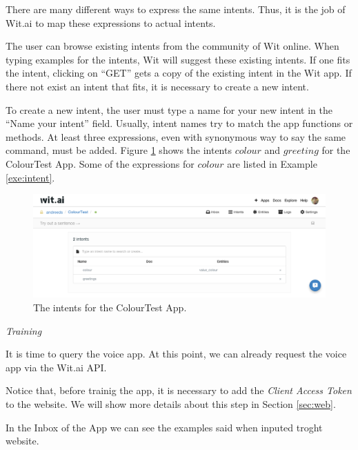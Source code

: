 There are many different ways to express the same intents. 
Thus, it is the job of Wit.ai to map these expressions to actual intents.

The user can browse existing intents from the community of Wit online.
When typing examples for the intents, Wit will suggest these existing intents. 
If one fits the intent, clicking on “GET” gets a copy of the existing intent in the Wit app.
If there not exist an intent that fits, it is necessary to create a new intent.

To create a new intent, the user must type a name for your new intent in the ``Name your intent'' field.
Usually, intent names try to match the app functions or methods. 
At least three expressions, even with synonymous way to say the same command, must be added.
Figure \ref{fig:entents} shows the intents $colour$ and $greeting$ for the ColourTest App.
Some of the expressions for $colour$ are listed in Example \ref{exe:intent}.


\begin{figure}[!h]
    \includegraphics[width=\textwidth]{figures/entities.png}
    \caption{The intents for the ColourTest App.}
    \label{fig:entents}
\end{figure}


\emph{Training}

It is time to query the voice app.
At this point, we can already request the voice app via the Wit.ai API.

Notice that, before trainig the app, it is necessary to add the \emph{Client Access Token} to the website.
We will show more details about this step in Section \ref{sec:web}.

In the Inbox of the App we can see the examples said when inputed troght website.


